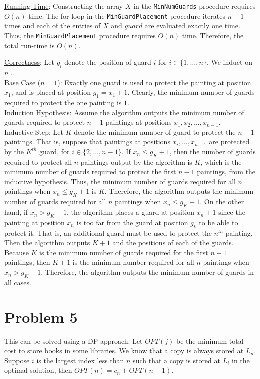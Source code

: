 \documentclass[twoside,11pt]{homework}
\begin{document}
\noindent
\underline{Running Time}:  Constructing the array $X$ in the \texttt{MinNumGuards} procedure requires $O(n)$ time.   The for-loop in the \texttt{MinGuardPlacement} procedure iterates $n-1$ times and each of the entries of $X$ and $guard$ are evaluated exactly one time.  Thus, the \texttt{MinGuardPlacement} procedure requires $O(n)$ time.  Therefore, the total run-time is $O(n)$.

\noindent
\underline{Correctness}:  Let $g_i$ denote the position of guard $i$ for $i \in \{1, \dots, n\}$.  We induct on $n$ .\\
Base Case ($n=1$): Exactly one guard is used to protect the painting at position $x_1$,  and is placed at position $g_1 = x_1 + 1$.  Clearly,  the minimum number of guards required to protect the one painting is $1$. \\
Induction Hypothesis: Assume the algorithm outputs the minimum number of guards required to protect $n-1$ paintings at positions $x_1,  x_2, \dots,  x_{n-1}$. \\
Inductive Step: Let $K$ denote the minimum number of guard to protect the $n-1$ paintings.  That is, suppose that paintings at positions $x_i, \dots, x_{n-1}$ are protected by the $K^{th}$ guard, for $i \in \{2, \dots, n-1\}$.  If $x_n \leq g_K + 1$,  then the number of guards required to protect all $n$ paintings output by the algorithm is $K$, which is the minimum number of guards required to protect the first $n-1$ paintings,  from the inductive hypothesis.  Thus, the minimum number of guards required for all $n$ paintings when $x_n \leq g_K + 1$ is $K$.  Therefore,  the algorithm outputs the minimum number of guards required for all $n$ paintings when $x_n \leq g_K + 1$.  On the other hand, if $x_n > g_K + 1$,  the algorithm places a guard at position $x_n + 1$ since the painting at position $x_n$ is too far from the guard at position $g_k$ to be able to protect it.  That is,  an additional guard must be used to protect the $n^{th}$ painting.  Then the algorithm outputs $K+1$ and the positions of each of the guards.  Because $K$ is the minimum number of guards required for the first $n-1$ paintings, then $K+1$ is the minimum number required for all $n$ paintings when $x_n > g_K + 1$. Therefore, the algorithm outputs the minimum number of guards in all cases. 




\section*{Problem 5}
This can be solved using a DP approach.  Let $OPT(j)$ be the minimum total cost to store books in some libraries.  We know that a copy is always stored at $L_n$.  Suppose $i$ is the largest index less than $n$ such that a copy is stored at $L_i$ in the optimal solution,  then $OPT(n) = c_n + OPT(n-1)$.  \\
\end{document}
